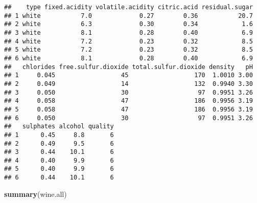 \documentclass[]{article}
\newenvironment{Shaded}{\begin{snugshade}}{\end{snugshade}}
\newcommand{\KeywordTok}[1]{\textcolor[rgb]{0.13,0.29,0.53}{\textbf{#1}}}
\newcommand{\NormalTok}[1]{#1}
\begin{document}
\begin{verbatim}
##    type fixed.acidity volatile.acidity citric.acid residual.sugar
## 1 white           7.0             0.27        0.36           20.7
## 2 white           6.3             0.30        0.34            1.6
## 3 white           8.1             0.28        0.40            6.9
## 4 white           7.2             0.23        0.32            8.5
## 5 white           7.2             0.23        0.32            8.5
## 6 white           8.1             0.28        0.40            6.9
##   chlorides free.sulfur.dioxide total.sulfur.dioxide density   pH
## 1     0.045                  45                  170  1.0010 3.00
## 2     0.049                  14                  132  0.9940 3.30
## 3     0.050                  30                   97  0.9951 3.26
## 4     0.058                  47                  186  0.9956 3.19
## 5     0.058                  47                  186  0.9956 3.19
## 6     0.050                  30                   97  0.9951 3.26
##   sulphates alcohol quality
## 1      0.45     8.8       6
## 2      0.49     9.5       6
## 3      0.44    10.1       6
## 4      0.40     9.9       6
## 5      0.40     9.9       6
## 6      0.44    10.1       6
\end{verbatim}

\begin{Shaded}
\begin{Highlighting}[]
\KeywordTok{summary}\NormalTok{(wine.all)}
\end{Highlighting}
\end{Shaded}
\end{document}
